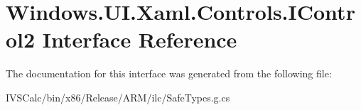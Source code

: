 \hypertarget{interface_windows_1_1_u_i_1_1_xaml_1_1_controls_1_1_i_control2}{}\section{Windows.\+U\+I.\+Xaml.\+Controls.\+I\+Control2 Interface Reference}
\label{interface_windows_1_1_u_i_1_1_xaml_1_1_controls_1_1_i_control2}


The documentation for this interface was generated from the following file\+:\begin{DoxyCompactItemize}
\item 
I\+V\+S\+Calc/bin/x86/\+Release/\+A\+R\+M/ilc/Safe\+Types.\+g.\+cs\end{DoxyCompactItemize}
